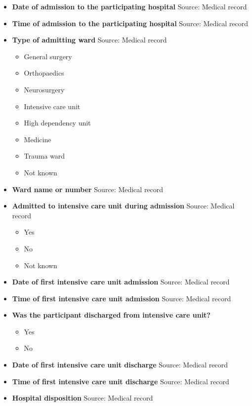 \documentclass[
]{scrartcl}
\providecommand{\tightlist}{%
  \setlength{\itemsep}{0pt}\setlength{\parskip}{0pt}}\usepackage{longtable,booktabs,array}
\begin{document}
\begin{itemize}
\item
  \textbf{Date of admission to the participating hospital} Source:
  Medical record
\item
  \textbf{Time of admission to the participating hospital} Source:
  Medical record
\item
  \textbf{Type of admitting ward} Source: Medical record

  \begin{itemize}
  \tightlist
  \item
    General surgery
  \item
    Orthopaedics
  \item
    Neurosurgery
  \item
    Intensive care unit
  \item
    High dependency unit
  \item
    Medicine
  \item
    Trauma ward
  \item
    Not known
  \end{itemize}
\item
  \textbf{Ward name or number} Source: Medical record
\item
  \textbf{Admitted to intensive care unit during admission} Source:
  Medical record

  \begin{itemize}
  \tightlist
  \item
    Yes
  \item
    No
  \item
    Not known
  \end{itemize}
\item
  \textbf{Date of first intensive care unit admission} Source: Medical
  record
\item
  \textbf{Time of first intensive care unit admission} Source: Medical
  record
\item
  \textbf{Was the participant discharged from intensive care unit?}

  \begin{itemize}
  \tightlist
  \item
    Yes
  \item
    No
  \end{itemize}
\item
  \textbf{Date of first intensive care unit discharge} Source: Medical
  record
\item
  \textbf{Time of first intensive care unit discharge} Source: Medical
  record
\item
  \textbf{Hospital disposition} Source: Medical record


\end{itemize}
\end{document}
